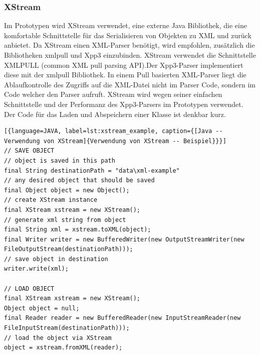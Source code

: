 \documentclass[
							a4paper, 
							11pt, 
							openany, 
							liststotoc,
							parskip=half, 
   							headings=normal
						]{scrreprt}
\begin{document}
{\clearpage

\subsubsection{XStream} \label{ssse:grundlagen_java_xstream}
Im Prototypen wird XStream verwendet, eine externe Java Bibliothek, die eine komfortable Schnittstelle für das Serialisieren von Objekten zu XML und zurück anbietet.\newline
Da XStream einen XML-Parser benötigt, wird empfohlen, zusätzlich die Bibliotheken xmlpull und Xpp3 einzubinden.\cite{xstream:tutorial}\newline
XStream verwendet die Schnittstelle XMLPULL (common XML pull parsing API).\linebreak Der Xpp3-Parser implementiert diese mit der xmlpull Bibliothek.\cite{xpp3:xmlpull}\newline
In einem Pull basierten XML-Parser liegt die Ablaufkontrolle des Zugriffs auf die XML-Datei nicht im Parser Code, sondern im Code welcher den Parser aufruft.\cite{wiki:xmlpullparser}\newline
XStream wird wegen seiner einfachen Schnittstelle und der Performanz des Xpp3-Parsers im Prototypen verwendet.
Der Code für das Laden und Abspeichern einer Klasse ist denkbar kurz.\bigskip

\begin{lstlisting}[{language=JAVA, label=lst:xstream_example, caption={[Java -- Verwendung von XStream]{Verwendung von XStream -- Beispiel}}}]
// SAVE OBJECT
// object is saved in this path
final String destinationPath = "data\xml-example"
// any desired object that should be saved
final Object object = new Object();
// create XStream instance
final XStream xstream = new XStream();
// generate xml string from object
final String xml = xstream.toXML(object);
final Writer writer = new BufferedWriter(new OutputStreamWriter(new 						FileOutputStream(destinationPath)));
// save object in destination
writer.write(xml);

// LOAD OBJECT
final XStream xstream = new XStream();
Object object = null;
final Reader reader = new BufferedReader(new InputStreamReader(new 							FileInputStream(destinationPath)));
// load the object via XStream
object = xstream.fromXML(reader);
\end{lstlisting}

\clearpage

}
\end{document}
